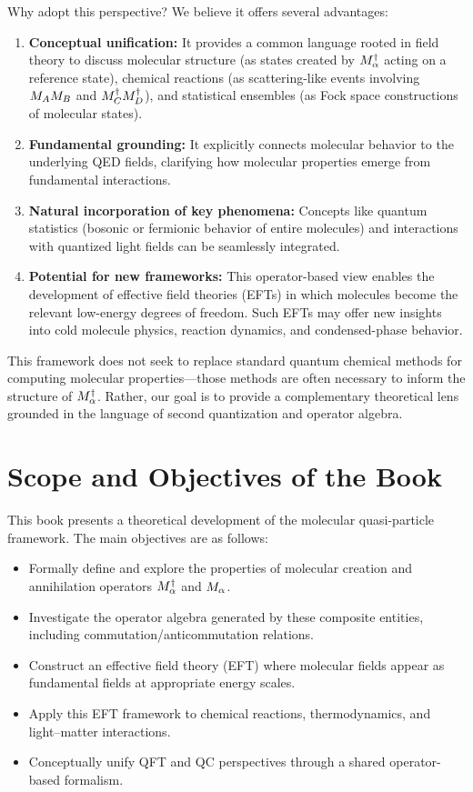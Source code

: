 Why adopt this perspective? We believe it offers several advantages:
\begin{enumerate}
	\item \textbf{Conceptual unification:} It provides a common language rooted in field theory to discuss molecular structure (as states created by \(M^\dagger_{\alpha}\) acting on a reference state), chemical reactions (as scattering-like events involving \(M_{A}M_{B}\) and \(M^\dagger_{C}M^\dagger_{D}\)), and statistical ensembles (as Fock space constructions of molecular states).
	\item \textbf{Fundamental grounding:} It explicitly connects molecular behavior to the underlying QED fields, clarifying how molecular properties emerge from fundamental interactions.
	\item \textbf{Natural incorporation of key phenomena:} Concepts like quantum statistics (bosonic or fermionic behavior of entire molecules) and interactions with quantized light fields can be seamlessly integrated.
	\item \textbf{Potential for new frameworks:} This operator-based view enables the development of effective field theories (EFTs) in which molecules become the relevant low-energy degrees of freedom. Such EFTs may offer new insights into cold molecule physics, reaction dynamics, and condensed-phase behavior.
\end{enumerate}

This framework does not seek to replace standard quantum chemical methods for computing molecular properties—those methods are often necessary to inform the structure of \(M^\dagger_{\alpha}\). Rather, our goal is to provide a complementary theoretical lens grounded in the language of second quantization and operator algebra.

\section{Scope and Objectives of the Book}
\label{sec:intro_scope}

This book presents a theoretical development of the molecular quasi-particle framework. The main objectives are as follows:
\begin{itemize}
	\item Formally define and explore the properties of molecular creation and annihilation operators \(M^\dagger_{\alpha}\) and \(M_{\alpha}\).
	\item Investigate the operator algebra generated by these composite entities, including commutation/anticommutation relations.
	\item Construct an effective field theory (EFT) where molecular fields appear as fundamental fields at appropriate energy scales.
	\item Apply this EFT framework to chemical reactions, thermodynamics, and light–matter interactions.
	\item Conceptually unify QFT and QC perspectives through a shared operator-based formalism.
\end{itemize}

